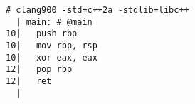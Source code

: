 \begin{lstlisting}[language={},numbers=none,title=\href{https://godbolt.org/z/CHeY7r}{\texttt{godbolt.org/z/CHeY7r}}]
# clang900 -std=c++2a -stdlib=libc++
  | main: # @main
10|   push rbp
10|   mov rbp, rsp
10|   xor eax, eax
12|   pop rbp
12|   ret
  |
\end{lstlisting}
